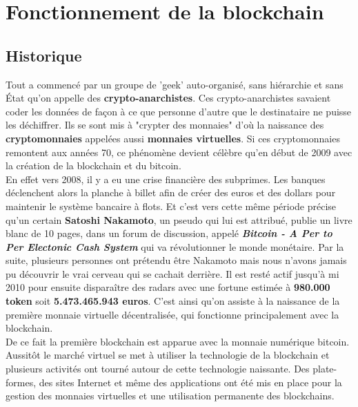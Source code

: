 \documentclass[12pt]{report}
\begin{document}
\newpage
\section{Fonctionnement de la blockchain}


  \subsection{Historique}
\hspace{1cm} Tout a commencé par un groupe de 'geek' auto-organisé, sans hiérarchie et sans État qu'on appelle des \textbf{crypto-anarchistes}. Ces crypto-anarchistes savaient coder les données de façon à ce que personne d'autre que le destinataire ne puisse les déchiffrer. Ils se sont mis à "crypter des monnaies" d'où la naissance des \textbf{cryptomonnaies} appelées aussi \textbf{ monnaies virtuelles}. Si ces cryptomonnaies remontent aux années 70, ce phénomène devient célèbre qu'en début de 2009 avec la création de la blockchain et du bitcoin.\\

\hspace{1cm} En effet vers 2008, il y a eu une crise financière des subprimes. Les banques déclenchent alors la planche à billet afin de créer des euros et des dollars pour maintenir le système bancaire à flots. Et c'est vers cette même période précise qu'un certain \textbf{Satoshi Nakamoto}, un pseudo qui lui est attribué, publie un livre blanc de 10 pages, dans un forum de discussion, appelé \textbf{\textit{Bitcoin - A Per to Per Electonic Cash System }} qui va révolutionner le monde monétaire. Par la suite, plusieurs personnes ont prétendu être Nakamoto mais nous n'avons jamais pu découvrir le vrai cerveau qui se cachait derrière. Il est resté actif jusqu'à mi 2010 pour ensuite disparaître des radars avec une fortune estimée à \textbf{980.000 token} soit \textbf{5.473.465.943 euros}. C'est ainsi qu'on assiste à la naissance  de la première monnaie virtuelle décentralisée, qui fonctionne principalement avec la blockchain. \\ 

\hspace{1cm} De ce fait la première blockchain est apparue avec la monnaie numérique bitcoin. Aussitôt le marché virtuel se met à utiliser la technologie de la blockchain et plusieurs activités ont tourné autour de cette technologie naissante. Des plate-formes, des sites Internet et même des applications ont été mis en place pour la gestion des monnaies virtuelles et une utilisation permanente des blockchains.
\end{document}
